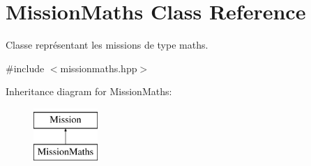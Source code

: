 \hypertarget{class_mission_maths}{\section{Mission\-Maths Class Reference}
\label{class_mission_maths}
}


Classe représentant les missions de type maths.  




{\ttfamily \#include $<$missionmaths.\-hpp$>$}

Inheritance diagram for Mission\-Maths\-:\begin{figure}[H]
\begin{center}
\leavevmode
\includegraphics[height=2.000000cm]{class_mission_maths}
\end{center}
\end{figure}
